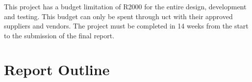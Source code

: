 This project has a budget limitation of R2000 for the entire design, development and testing.
This budget can only be spent through \gls{uct} with their approved suppliers and vendors.
The project must be completed in 14 weeks from the start to the submission of the final report.

\section{Report Outline}
\lipsum[1]